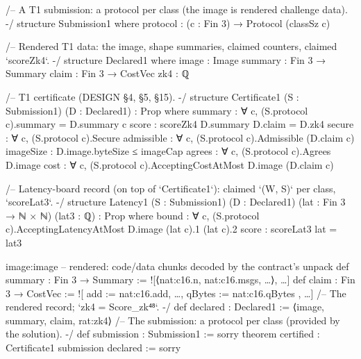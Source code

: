 \begin{leancode}[fontsize=\footnotesize,label={\footnotesize Contract/Certificate.lean (abridged)}]
/-- A T1 submission: a protocol per class (the image is rendered challenge data). -/
structure Submission1 where
  protocol : (c : Fin 3) → Protocol (classSz c)

/-- Rendered T1 data: the image, shape summaries, claimed counters, claimed `scoreZk4`. -/
structure Declared1 where
  image : Image
  summary : Fin 3 → Summary
  claim : Fin 3 → CostVec
  zk4 : ℚ

/-- T1 certificate (DESIGN §4, §5, §15). -/
structure Certificate1 (S : Submission1) (D : Declared1) : Prop where
  summary : ∀ c, (S.protocol c).summary = D.summary c
  score : scoreZk4 D.summary D.claim = D.zk4
  secure : ∀ c, (S.protocol c).Secure
  admissible : ∀ c, (S.protocol c).Admissible (D.claim c)
  imageSize : D.image.byteSize ≤ imageCap
  agrees : ∀ c, (S.protocol c).Agrees D.image
  cost : ∀ c, (S.protocol c).AcceptingCostAtMost D.image (D.claim c)

/-- Latency-board record (on top of `Certificate1`): claimed `(W, S)` per class, `scoreLat3`. -/
structure Latency1 (S : Submission1) (D : Declared1) (lat : Fin 3 → ℕ × ℕ) (lat3 : ℚ) : Prop where
  bound : ∀ c, (S.protocol c).AcceptingLatencyAtMost D.image (lat c).1 (lat c).2
  score : scoreLat3 lat = lat3
\end{leancode}

\begin{leancode}[fontsize=\footnotesize,label={\footnotesize Challenge/T1.lean.in (abridged)}]
{{image:image}}                  -- rendered: code/data chunks decoded by the contract's unpack
def summary : Fin 3 → Summary := ![⟨{{nat:c16.n}}, {{nat:c16.msgs}}, …⟩, …]
def claim : Fin 3 → CostVec := ![{ add := {{nat:c16.add}}, …, qBytes := {{nat:c16.qBytes}} }, …]
/-- The rendered record; `zk4 = Score_zk⁴⁸`. -/
def declared : Declared1 := ⟨image, summary, claim, {{rat:zk4}}⟩
/-- The submission: a protocol per class (provided by the solution). -/
def submission : Submission1 := sorry
theorem certified : Certificate1 submission declared := sorry
\end{leancode}

